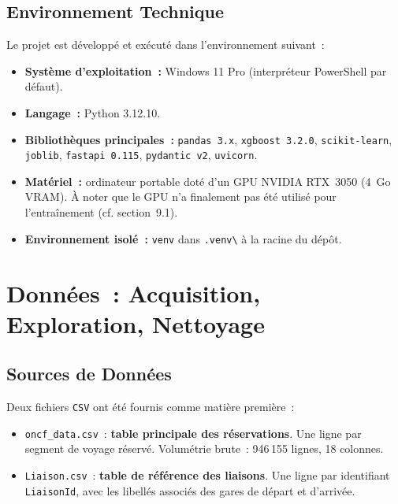\documentclass[11pt, a4paper]{article}
\begin{document}
\subsection{Environnement Technique}

Le projet est développé et exécuté dans l'environnement suivant~:
\begin{itemize}
\item \textbf{Système d'exploitation~:} Windows 11 Pro (interpréteur
    PowerShell par défaut).
\item \textbf{Langage~:} Python 3.12.10.
\item \textbf{Bibliothèques principales~:} \texttt{pandas~3.x},
    \texttt{xgboost~3.2.0}, \texttt{scikit-learn},
    \texttt{joblib}, \texttt{fastapi~0.115}, \texttt{pydantic~v2},
    \texttt{uvicorn}.
\item \textbf{Matériel~:} ordinateur portable doté d'un GPU NVIDIA
    RTX~3050 (4~Go VRAM). À noter que le GPU n'a finalement pas été
    utilisé pour l'entraînement (cf. section~9.1).
\item \textbf{Environnement isolé~:} \texttt{venv} dans
    \texttt{.venv\textbackslash} à la racine du dépôt.
\end{itemize}

\newpage
\section{Données~: Acquisition, Exploration, Nettoyage}

\subsection{Sources de Données}

Deux fichiers \texttt{CSV} ont été fournis comme matière première~:

\begin{itemize}
\item \texttt{oncf\_data.csv}~: \textbf{table principale des
    réservations}. Une ligne par segment de voyage réservé. Volumétrie
    brute~: 946\,155 lignes, 18 colonnes.
\item \texttt{Liaison.csv}~: \textbf{table de référence des liaisons}.
    Une ligne par identifiant \texttt{LiaisonId}, avec les libellés
    associés des gares de départ et d'arrivée.
\end{itemize}
\end{document}
